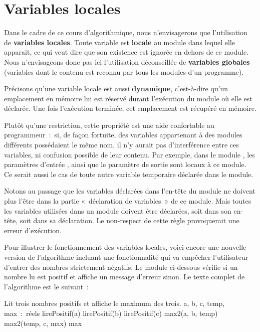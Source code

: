 \section{Variables locales}

	Dans le cadre de ce cours d’algorithmique,
	nous n’envisagerons que l’utilisation de 
	\textbf{variables locales}. 
	Toute variable est \textbf{locale} au module 
	dans lequel elle apparait, ce qui veut dire que son existence
	est ignorée en dehors de ce module. 
	Nous n’envisageons donc pas ici l’utilisation déconseillée de 
	\textbf{variables globales} 
	(variables dont le contenu est reconnu 
	par tous les modules d’un programme).

	Précisons qu’une variable locale est aussi
	\textbf{dynamique}, c’est-à-dire qu’un emplacement en mémoire lui est
	réservé durant l’exécution du module où elle est déclarée. Une fois
	l’exécution terminée, cet emplacement est récupéré en mémoire.

	Plutôt qu’une restriction, cette propriété est
	une aide confortable au programmeur~:~si, de
	façon fortuite, des variables appartenant à des modules différents
	possédaient le même nom, il n’y aurait pas d’interférence entre ces
	variables, ni confusion possible de leur
	contenu. Par exemple, dans le module
	, les paramètres d’entrée 
	, 
	ainsi que le paramètre de sortie 
	sont locaux à ce module. 
	Ce serait aussi le cas de toute autre variable temporaire 
	déclarée dans le module.

	Notons au passage que les variables déclarées dans l’en-tête du module ne
	doivent plus l’être dans la partie «~déclaration de variables~» de ce
	module. Mais toutes les variables utilisées dans un module doivent être
	déclarées, soit dans son en-tête, soit dans sa déclaration. Le
	non-respect de cette règle provoquerait une erreur d’exécution.

	Pour illustrer le fonctionnement des variables
	locales, voici encore une nouvelle version de l’algorithme incluant une
	fonctionnalité qui va empêcher l’utilisateur d’entrer des nombres
	strictement négatifs. Le module
	 ci-dessous
	vérifie si un nombre lu est positif et affiche un message
	d’erreur sinon. Le texte complet de l’algorithme est
	le suivant~:

	\begin{Pseudocode}
	\LComment Lit trois nombres positifs et affiche le maximum des trois.
		\Decl a, b, c, temp, max~:~réels
		\Stmt lirePositif(a)
		\Stmt lirePositif(b)
		\Stmt lirePositif(c)
		\Stmt max2(a, b, temp)
		\Stmt max2(temp, c, max)
		\Write max
	\EndModule
	\end{Pseudocode}

